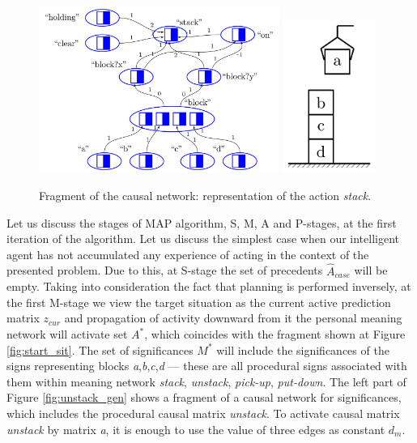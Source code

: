 \documentclass[review]{elsarticle}
\begin{document}
\begin{figure}
	\centering
	\includegraphics[width=0.7\textwidth]{plan_nets-1}
	\includegraphics[width=0.27\textwidth]{block_world-2}
	\caption{Fragment of the causal network: representation of the action \textit{stack}.}	
	\label{fig:stack_sig}	
\end{figure}

Let us discuss the stages of MAP algorithm, S, M, A and P-stages, at the first iteration of the algorithm. Let us discuss the simplest case when our intelligent agent has not accumulated any experience of acting in the context of the presented problem. Due to this, at S-stage the set of precedents $\hat A_{case}$ will be empty. Taking into consideration the fact that planning is performed inversely, at the first M-stage we view the target situation as the current active prediction matrix $z_{cur}$ and propagation of activity downward from it the personal meaning network will activate set $A^*$, which coincides with the fragment shown at Figure \ref{fig:start_sit}. The set of significances $M^*$ will include the significances of the signs representing blocks \textit{a},\textit{b},\textit{c},\textit{d} --- these are all procedural signs associated with them within meaning network \textit{stack}, \textit{unstack}, \textit{pick-up}, \textit{put-down}. The left part of Figure \ref{fig:unstack_gen} shows a fragment of a causal network for significances, which includes the procedural causal matrix \textit{unstack}. To activate causal matrix \textit{unstack} by matrix \textit{a}, it is enough to use the value of three edges as constant $d_m$.
\end{document}
